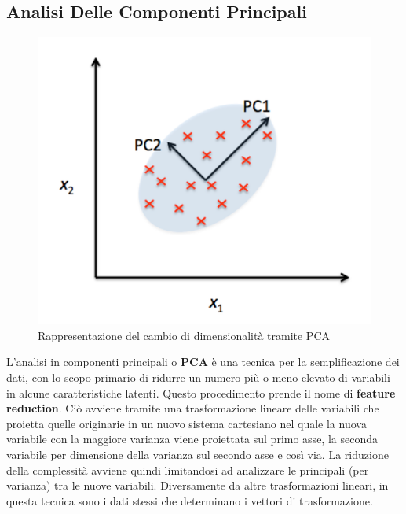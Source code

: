 \subsection{Analisi Delle Componenti Principali}
\begin{figure}[]
	\centering
	\includegraphics[scale=0.8]{images/pca.png}
	\caption{Rappresentazione del cambio di dimensionalità tramite PCA}
\end{figure}
L'analisi in componenti principali o \textbf{PCA} è una tecnica per la semplificazione dei dati, con lo scopo primario di ridurre un numero più o meno elevato di variabili in alcune caratteristiche latenti. Questo procedimento prende il nome di \textbf{feature reduction}. Ciò avviene tramite una trasformazione lineare delle variabili che proietta quelle originarie in un nuovo sistema cartesiano nel quale la nuova variabile con la maggiore varianza viene proiettata sul primo asse, la seconda variabile per dimensione della varianza sul secondo asse e così via. La riduzione della complessità avviene quindi limitandosi ad analizzare le principali (per varianza) tra le nuove variabili. Diversamente da altre trasformazioni lineari, in questa tecnica sono i dati stessi che determinano i vettori di trasformazione.\\

